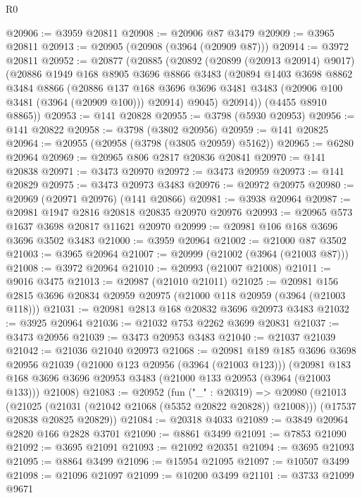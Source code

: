 \begin{lexlean}{R0}
\begin{coremodule}
@20906 := @3959 @20811
@20908 := @20906 @87 @3479
@20909 := @3965 @20811
@20913 := @20905 (@20908 (@3964 (@20909 @87)))
@20914 := @3972 @20811
@20952 := @20877
    (@20885
      (@20892
        (@20899 (@20913 @20914) @9017)
        (@20886
          @1949
          @168
          @8905
          @3696
          @8866
          @3483
          (@20894
            @1403
            @3698
            @8862
            @3484
            @8866
            (@20886
              @137
              @168
              @3696
              @3696
              @3481
              @3483
              (@20906 @100 @3481 (@3964 (@20909 @100)))
              @20914)
            @9045)
          @20914))
      (@4455 @8910 @8865))
@20953 := @141 @20828
@20955 := @3798 (@5930 @20953)
@20956 := @141 @20822
@20958 := @3798 (@3802 @20956)
@20959 := @141 @20825
@20964 := @20955 (@20958 (@3798 (@3805 @20959) @5162))
@20965 := @6280 @20964
@20969 := @20965 @806 @2817 @20836 @20841
@20970 := @141 @20838
@20971 := @3473 @20970
@20972 := @3473 @20959
@20973 := @141 @20829
@20975 := @3473 @20973 @3483
@20976 := @20972 @20975
@20980 := @20969 (@20971 @20976) (@141 @20866)
@20981 := @3938 @20964
@20987 := @20981 @1947 @2816 @20818 @20835 @20970 @20976
@20993 := @20965 @573 @1637 @3698 @20817 @11621 @20970
@20999 := @20981 @106 @168 @3696 @3696 @3502 @3483
@21000 := @3959 @20964
@21002 := @21000 @87 @3502
@21003 := @3965 @20964
@21007 := @20999 (@21002 (@3964 (@21003 @87)))
@21008 := @3972 @20964
@21010 := @20993 (@21007 @21008)
@21011 := @9016 @3475
@21013 := @20987 (@21010 @21011)
@21025 := @20981 @156 @2815 @3696 @20834 @20959 @20975 (@21000 @118 @20959 (@3964 (@21003 @118)))
@21031 := @20981 @2813 @168 @20832 @3696 @20973 @3483
@21032 := @3925 @20964
@21036 := @21032 @753 @2262 @3699 @20831
@21037 := @3473 @20956
@21039 := @3473 @20953 @3483
@21040 := @21037 @21039
@21042 := @21036 @21040 @20973
@21068 := @20981
    @189
    @185
    @3696
    @3698
    @20956
    @21039
    (@21000 @123 @20956 (@3964 (@21003 @123)))
    (@20981 @183 @168 @3696 @3696 @20953 @3483 (@21000 @133 @20953 (@3964 (@21003 @133))) @21008)
@21083 := @20952
    (fun ("_" : @20319) =>
    @20980
      (@21013 (@21025 (@21031 (@21042 @21068 (@5352 @20822 @20828)) @21008)))
      (@17537 @20838 @20825 @20829))
@21084 := @20318 @4033
@21089 := @3849 @20964 @2820 @166 @2828 @3701
@21090 := @8861 @3499
@21091 := @7853 @21090
@21092 := @3695 @21091
@21093 := @21092 @20351
@21094 := @3695 @21093
@21095 := @8864 @3499
@21096 := @15954 @21095
@21097 := @10507 @3499
@21098 := @21096 @21097
@21099 := @10200 @3499
@21101 := @3733 @21099 @9671

\end{coremodule}
\end{lexlean}
